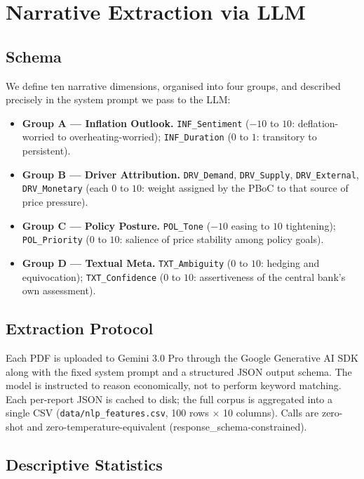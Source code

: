\documentclass[AER]{AEA}
\begin{document}
\section{Narrative Extraction via LLM}\label{sec:nlp}

\subsection{Schema}
We define ten narrative dimensions, organised into four groups, and
described precisely in the system prompt we pass to the LLM:
\begin{itemize}
\item \textbf{Group A --- Inflation Outlook.}
\texttt{INF\_Sentiment} ($-10$ to $10$: deflation-worried to
overheating-worried); \texttt{INF\_Duration} ($0$ to $1$: transitory to
persistent).
\item \textbf{Group B --- Driver Attribution.} \texttt{DRV\_Demand},
\texttt{DRV\_Supply}, \texttt{DRV\_External}, \texttt{DRV\_Monetary} (each
$0$ to $10$: weight assigned by the PBoC to that source of price pressure).
\item \textbf{Group C --- Policy Posture.} \texttt{POL\_Tone} ($-10$ easing
to $10$ tightening); \texttt{POL\_Priority} ($0$ to $10$: salience of price
stability among policy goals).
\item \textbf{Group D --- Textual Meta.} \texttt{TXT\_Ambiguity} ($0$ to
$10$: hedging and equivocation); \texttt{TXT\_Confidence} ($0$ to $10$:
assertiveness of the central bank's own assessment).
\end{itemize}

\subsection{Extraction Protocol}
Each PDF is uploaded to Gemini 3.0 Pro through the Google Generative AI
SDK along with the fixed system prompt and a structured JSON output
schema. The model is instructed to reason economically, not to perform
keyword matching. Each per-report JSON is cached to disk; the full corpus
is aggregated into a single CSV
(\texttt{data/nlp\_features.csv}, 100 rows $\times$ 10 columns). Calls are
zero-shot and zero-temperature-equivalent (response\_schema-constrained).

\subsection{Descriptive Statistics}
\end{document}
